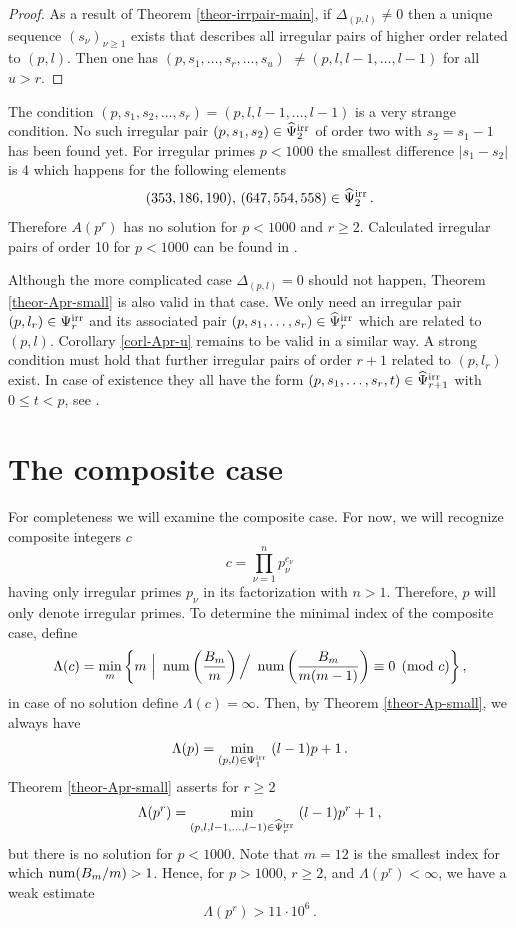 \documentclass[12pt,english]{article}
\begin{document}
\begin{proof}
As a result of Theorem \ref{theor-irrpair-main}, if $\Delta_{(p,l)} \neq 0$
then a unique sequence $(s_\nu)_{\nu \ge 1}$ exists that
describes all irregular pairs of higher order related to $(p,l)$.
Then one has $(p,s_1,\ldots,s_r,\ldots,s_u)$ $\neq (p,l,l-1,\ldots,l-1)$
for all $u > r$.
\end{proof}
\medskip

The condition $(p,s_1,s_2,\ldots,s_r) = (p,l,l-1,\ldots,l-1)$
is a very strange condition. No such irregular pair $(p,s_1,s_2) \in \widehat{\Psi}^{\rm irr}_2$ of order two
with $s_2 = s_1-1$ has been found yet. For irregular primes $p<1000$ the
smallest difference $|s_1-s_2|$ is 4 which happens for the following elements
\[
   (353,186,190), \, (647,554,558) \in \widehat{\Psi}^{\rm irr}_2 \,.
\]
Therefore $A(p^r)$ has no solution for $p < 1000$ and $r \geq 2$.
Calculated irregular pairs of order 10 for $p<1000$ can be found in
\cite[Table A.3]{kellner04irrpowbn}.

\begin{remark} \label{rem-delta-0}
Although the more complicated case $\Delta_{(p,l)} = 0$ should not happen, Theorem
\ref{theor-Apr-small} is also valid in that case. We only need
an irregular pair $(p,l_r) \in \Psi^{\rm irr}_r$ and its associated pair
$(p,s_1,\ldots,s_r) \in \widehat{\Psi}^{\rm irr}_r$ which are related to $(p,l)$.
Corollary \ref{corl-Apr-u} remains to be valid in a similar way.
A strong condition must hold that further irregular pairs of order $r+1$
related to $(p,l_r)$ exist.
In case of existence they all have the form
$(p,s_1,\ldots,s_r,t) \in \widehat{\Psi}^{\rm irr}_{r+1}$ with $0 \leq t < p$,
see \cite[Theorem 3.2, p.~8]{kellner04irrpowbn}.
\end{remark}

\section{The composite case}
\label{sect-comp-case}
\setcounter{equation}{0}

For completeness we will examine the composite case. For now, we will recognize composite
integers $c$
\[
    c = \prod_{\nu=1}^n p_\nu^{e_\nu}
\]
having only irregular primes $p_\nu$ in its factorization with $n > 1$.
Therefore, $p$ will only denote irregular primes.
To determine the minimal index of the composite case, define
\[
   \Lambda(c) = \min_m
     \left\{ m \,\,\Big|\,\,
        \mathop{\rm num}\nolimits \left( \frac{B_m}{m} \right) \Big/ \
           \mathop{\rm num}\nolimits \left( \frac{B_m}{m(m-1)} \right) \equiv 0 \pmod{c} \right\} ,
\]
in case of no solution define $\Lambda(c) = \infty$.
Then, by Theorem \ref{theor-Ap-small}, we always have
\[
   \Lambda(p) = \min_{(p,l) \in \IRR_1} \ (l-1)p+1 \,.
\]
Theorem \ref{theor-Apr-small} asserts for $r \geq 2$
\[
   \Lambda(p^r) = \min_{(p,l,l-1,\ldots,l-1) \in \widehat{\Psi}^{\rm irr}_r} \ (l-1)p^r+1 \,,
\]
but there is no solution for $p < 1000$. Note that $m=12$ is the smallest index for
which $\mathop{\rm num}\nolimits(B_m/m) > 1$. Hence, for $p > 1000$, $r \geq 2$, and $\Lambda(p^r) < \infty$,
we have a weak estimate
\begin{equation} \label{eqn-LamdaC-pr}
   \Lambda(p^r) > 11 \cdot 10^6 \,.
\end{equation}
\end{document}
